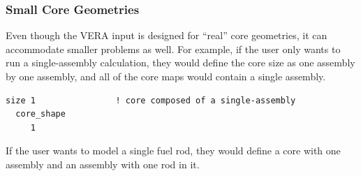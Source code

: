 \subsubsection{Small Core Geometries}
\label{sec:smallcoregeom}

Even though the VERA input is designed for ``real'' core geometries, it can accommodate smaller
problems as well.
For example, if the user only wants to run a single-assembly calculation, they would define the core size
as one assembly by one assembly, and all of the core maps would contain a single assembly.
\begin{Verbatim}[fontsize=\small]
  size 1                ! core composed of a single-assembly
  core_shape
     1
\end{Verbatim}

If the user wants to model a single fuel rod, they would define a core with one assembly and
an assembly with one rod in it.

